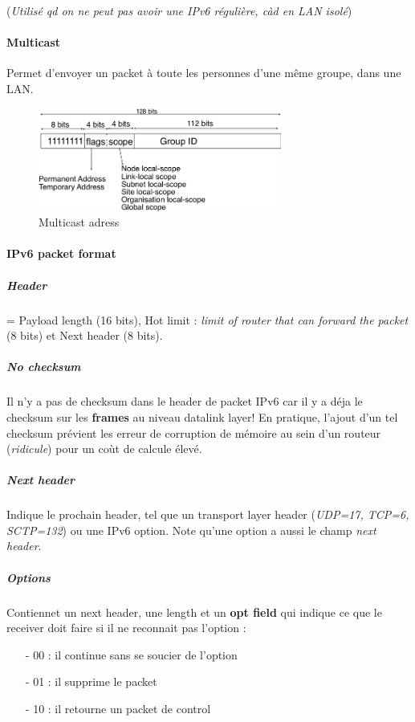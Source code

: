 (\textit{Utilisé qd on ne peut pas avoir une IPv6 régulière, càd en LAN isolé})

\paragraph{\textbf{Multicast}}
Permet d'envoyer un packet à toute les personnes d'une même groupe, dans une LAN.

\begin{figure}[h]
    \centering
    \includegraphics[width=8cm]{multicast.png}
    \caption{Multicast adress}
\end{figure}


\paragraph{\textbf{IPv6 packet format}}

\subparagraph{Header} = Payload length (16 bits), Hot limit : \textit{limit of router
that can forward the packet} (8 bits) et Next header (8 bits).

\subparagraph{No checksum}
Il n'y a pas de checksum dans le header de packet IPv6 car il y a déja le checksum
sur les \textbf{frames} au niveau datalink layer! En pratique, l'ajout d'un tel checksum prévient
les erreur de corruption de mémoire au sein d'un routeur (\textit{ridicule}) pour un coùt de
calcule élevé.

\subparagraph{Next header}
Indique le prochain header, tel que un transport layer header (\textit{UDP=17, TCP=6, SCTP=132}) ou une IPv6 option.  Note qu'une option a aussi le champ \textit{next header}.

\subparagraph{Options}
Contiennet un next header, une length et un \textbf{opt field} qui indique
ce que le receiver doit faire si il ne reconnait pas l'option : 
\begin{itemize}
    \item[-] 00 : il continue sans se soucier de l'option
    \item[-] 01 : il supprime le packet
    \item[-] 10 : il retourne un packet de control
\end{itemize}

